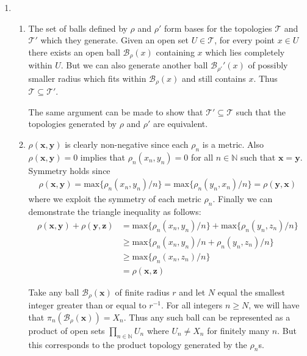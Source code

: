 \documentclass[11pt,letter]{article}
\begin{document}
\begin{enumerate}
    \item \begin{enumerate}
        \item The set of balls defined by $\rho$ and $\rho'$ form bases for the topologies $\mathcal{T}$ and $\mathcal{T}'$ which they generate. Given an open set $U \in \mathcal{T}$, for every point $x \in U$ there exists an open ball $\mathcal{B}_\rho(x)$ containing $x$ which lies completely within $U$. But we can also generate another ball $\mathcal{B}_{\rho'}'(x)$ of possibly smaller radius which fits within $\mathcal{B}_\rho(x)$ and still contains $x$. Thus $\mathcal{T} \subseteq \mathcal{T}'$.
        
        The same argument can be made to show that $\mathcal{T}' \subseteq \mathcal{T}$ such that the topologies generated by $\rho$ and $\rho'$ are equivalent.

        \item $\rho(\mathbf{x},\mathbf{y})$ is clearly non-negative since each $\rho_n$ is a metric. Also $\rho(\mathbf{x},\mathbf{y}) = 0$ implies that $\rho_n(x_n,y_n) = 0$ for all $n \in \mathbb{N}$ such that $\mathbf{x}=\mathbf{y}$. Symmetry holds since
        \begin{align*}
            \rho(\mathbf{x},\mathbf{y}) = \text{max}\{\rho_n(x_n,y_n)/n\} = \text{max}\{\rho_n(y_n,x_n)/n\} = \rho(\mathbf{y},\mathbf{x})
        \end{align*}
        where we exploit the symmetry of each metric $\rho_n$. Finally we can demonstrate the triangle inequality as follows:
        \begin{align*}
            \rho(\mathbf{x},\mathbf{y}) + \rho(\mathbf{y},\mathbf{z})
             & = \text{max}\{\rho_n(x_n,y_n)/n\} + \text{max}\{\rho_n(y_n,z_n)/n\} \\
             & \ge \text{max}\{\rho_n(x_n,y_n)/n + \rho_n(y_n,z_n)/n\} \\
             & \ge \text{max}\{\rho_n(x_n,z_n)/n\} \\
             & = \rho(\mathbf{x},\mathbf{z})
        \end{align*}

        Take any ball $\mathcal{B}_\rho(\mathbf{x})$ of finite radius $r$ and let $N$ equal the smallest integer greater than or equal to $r^{-1}$. For all integers $n \ge N$, we will have that $\pi_n(\mathcal{B}_\rho(\mathbf{x})) = X_n$. Thus any such ball can be represented as a product of open sets $\prod_{n\in\mathbb{N}} U_n$ where $U_n \ne X_n$ for finitely many $n$. But this corresponds to the product topology generated by the $\rho_n$s.


\end{enumerate}
\end{enumerate}
\end{document}
